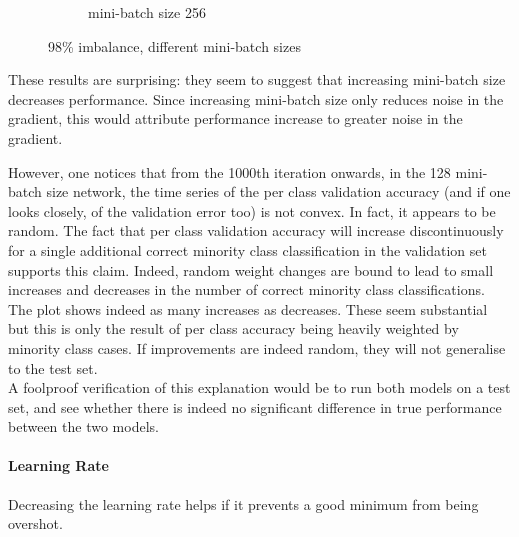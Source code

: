 \documentclass[a4paper,11pt]{article}
\begin{document}
\begin{figure}
\begin{minipage}[b]{\textwidth}
\begin{subfigure}{.5\textwidth}
        \caption{mini-batch size 256}\label{fig:2b}
      \end{subfigure} \par \vspace*{20pt} %
      \caption{98\% imbalance, different mini-batch sizes}\label{fig:2}
    \end{minipage}%
    \label{f47}
\end{figure}

These results are surprising: they seem to suggest that increasing mini-batch size decreases performance. Since increasing mini-batch size only reduces noise in the gradient, this would attribute performance increase to greater noise in the gradient. 

However, one notices that from the 1000th iteration onwards, in the 128 mini-batch size network, the time series of the per class validation accuracy (and if one looks closely, of the validation error too) is not convex. In fact, it appears to be random. The fact that per class validation accuracy will increase discontinuously for a single additional correct minority class classification in the validation set supports this claim. Indeed, random weight changes are bound to lead to small increases and decreases in the number of correct minority class classifications. The plot shows indeed as many increases as decreases. These seem substantial but this is only the result of per class accuracy being heavily weighted by minority class cases. If improvements are indeed random, they will not generalise to the test set. \\

A foolproof verification of this explanation would be to run both models on a test set, and see whether there is indeed no significant difference in true performance between the two models. \\	


\paragraph{Learning Rate}

Decreasing the learning rate helps if it prevents a good minimum from being overshot. 
\end{document}
